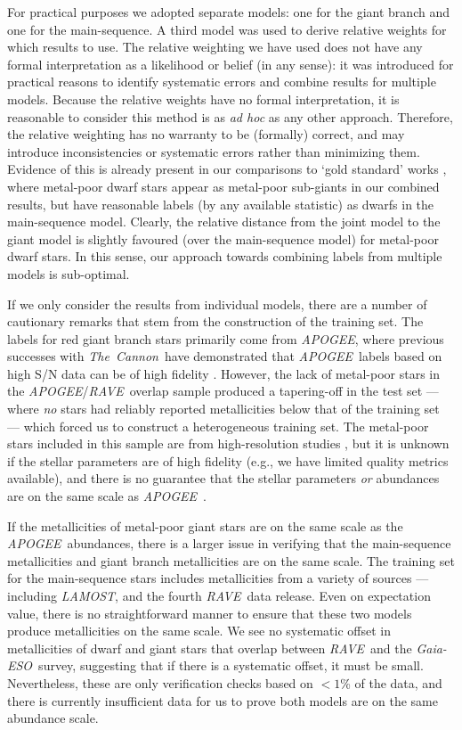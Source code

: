\documentclass[preprint,trackchanges]{aastex}
\newcommand{\acronym}[1]{{\small{#1}}}
\newcommand{\project}[1]{\textsl{#1}}
\newcommand{\thecannon}{\project{The~Cannon}}
\newcommand{\rave}{\project{\acronym{RAVE}}}
\newcommand{\ges}{\project{Gaia-ESO}}
\newcommand{\apogee}{\project{\acronym{APOGEE}}}
\newcommand{\lamost}{\project{\acronym{LAMOST}}}
\begin{document}
For practical purposes we adopted separate models: one for the giant branch and one
for the main-sequence.  A third model was used to derive relative weights for which
results to use.  The relative weighting we have used does not have any formal
interpretation as a likelihood or belief (in any sense): it was introduced for
practical reasons to identify systematic errors and combine results for multiple
models.  Because the relative weights have no formal interpretation, it is reasonable
to consider this method is as \emph{ad hoc} as any other approach.  Therefore, the
relative weighting has no warranty to be (formally) correct, and may introduce 
inconsistencies or systematic errors rather than
minimizing them.  Evidence of this is already present in our comparisons to
`gold standard' works \citep{Bensby_2014,Reddy_2003,Reddy_2006,Valenti_Fischer_2005},
where metal-poor dwarf stars appear as metal-poor sub-giants in our combined results,
but have reasonable labels (by any available statistic) as dwarfs in the main-sequence
model.  Clearly, the relative distance from the joint model to the giant model is 
slightly favoured (over the main-sequence model) for metal-poor dwarf stars. In this
sense, our approach towards combining labels from multiple models is sub-optimal.


If we only consider the results from individual models, there are a number of cautionary
remarks that stem from the construction of the training set.  The labels for red giant 
branch stars primarily come from \apogee, where previous successes with \thecannon\
have demonstrated that \apogee\ labels based on high S/N data can be of high fidelity
\citep{Ness_2015,Ness_2016,Ho_2016,Casey_2016b}.
However, the lack of metal-poor stars in the \apogee/\rave\ overlap sample produced
a tapering-off in the test set --- where \emph{no} stars had reliably reported metallicities
below that of the training set --- which forced us to construct a heterogeneous training
set.  The metal-poor stars included in this sample are from high-resolution studies
\citep{Fulbright_2010,Ruchti_2011}, but it is unknown if the stellar parameters are
of high fidelity (e.g., we have limited quality metrics available), and there is no
guarantee that the stellar parameters \emph{or} abundances are on the same scale as
\apogee\ \citep[and good reasons to believe they will not be; see][]{Smiljanic_2014}.


If the metallicities of metal-poor giant stars are on the same scale as the \apogee\
abundances, there is a larger issue in verifying that the main-sequence metallicities
and giant branch metallicities are on the same scale.  The training set for the
main-sequence stars includes metallicities from a variety of sources --- including
\lamost, and the fourth \rave\ data release.  Even on expectation value, there is 
no straightforward manner to ensure that these two models produce metallicities on
the same scale.  We see no systematic offset in metallicities of dwarf and giant
stars that overlap between \rave\ and the \ges\ survey, suggesting that if there is
a systematic offset, it must be small. Nevertheless, these are only verification checks based on $<1$\% of the
data, and there is currently insufficient data for us to prove both models are on
the same abundance scale.
\end{document}
